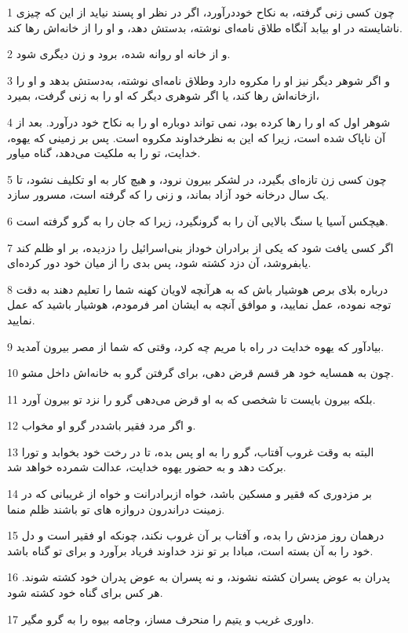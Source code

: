 \par 1 چون کسی زنی گرفته، به نکاح خوددرآورد، اگر در نظر او پسند نیاید از این که چیزی ناشایسته در او بیابد آنگاه طلاق نامه‌ای نوشته، بدستش دهد، و او را از خانه‌اش رها کند.
\par 2 و از خانه او روانه شده، برود و زن دیگری شود.
\par 3 و اگر شوهر دیگر نیز او را مکروه دارد وطلاق نامه‌ای نوشته، به‌دستش بدهد و او را ازخانه‌اش رها کند، یا اگر شوهری دیگر که او را به زنی گرفت، بمیرد،
\par 4 شوهر اول که او را رها کرده بود، نمی تواند دوباره او را به نکاح خود درآورد. بعد از آن ناپاک شده است، زیرا که این به نظرخداوند مکروه است. پس بر زمینی که یهوه، خدایت، تو را به ملکیت می‌دهد، گناه میاور.
\par 5 چون کسی زن تازه‌ای بگیرد، در لشکر بیرون نرود، و هیچ کار به او تکلیف نشود، تا یک سال درخانه خود آزاد بماند، و زنی را که گرفته است، مسرور سازد.
\par 6 هیچکس آسیا یا سنگ بالایی آن را به گرونگیرد، زیرا که جان را به گرو گرفته است.
\par 7 اگر کسی یافت شود که یکی از برادران خوداز بنی‌اسرائیل را دزدیده، بر او ظلم کند یابفروشد، آن دزد کشته شود، پس بدی را از میان خود دور کرده‌ای.
\par 8 درباره بلای برص هوشیار باش که به هرآنچه لاویان کهنه شما را تعلیم دهند به دقت توجه نموده، عمل نمایید، و موافق آنچه به ایشان امر فرمودم، هوشیار باشید که عمل نمایید.
\par 9 بیادآور که یهوه خدایت در راه با مریم چه کرد، وقتی که شما از مصر بیرون آمدید.
\par 10 چون به همسایه خود هر قسم قرض دهی، برای گرفتن گرو به خانه‌اش داخل مشو.
\par 11 بلکه بیرون بایست تا شخصی که به او قرض می‌دهی گرو را نزد تو بیرون آورد.
\par 12 و اگر مرد فقیر باشددر گرو او مخواب.
\par 13 البته به وقت غروب آفتاب، گرو را به او پس بده، تا در رخت خود بخوابد و تورا برکت دهد و به حضور یهوه خدایت، عدالت شمرده خواهد شد.
\par 14 بر مزدوری که فقیر و مسکین باشد، خواه ازبرادرانت و خواه از غریبانی که در زمینت دراندرون دروازه های تو باشند ظلم منما.
\par 15 درهمان روز مزدش را بده، و آفتاب بر آن غروب نکند، چونکه او فقیر است و دل خود را به آن بسته است، مبادا بر تو نزد خداوند فریاد برآورد و برای تو گناه باشد.
\par 16 پدران به عوض پسران کشته نشوند، و نه پسران به عوض پدران خود کشته شوند. هر کس برای گناه خود کشته شود.
\par 17 داوری غریب و یتیم را منحرف مساز، وجامه بیوه را به گرو مگیر.
